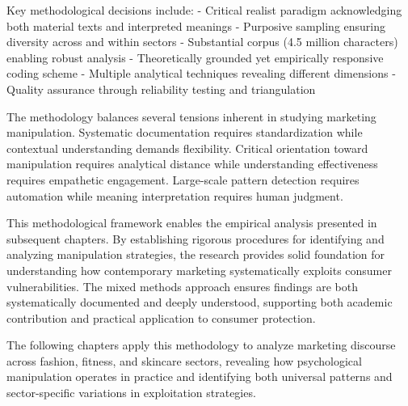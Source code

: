 Key methodological decisions include:
- Critical realist paradigm acknowledging both material texts and interpreted meanings
- Purposive sampling ensuring diversity across and within sectors
- Substantial corpus (4.5 million characters) enabling robust analysis
- Theoretically grounded yet empirically responsive coding scheme
- Multiple analytical techniques revealing different dimensions
- Quality assurance through reliability testing and triangulation

The methodology balances several tensions inherent in studying marketing manipulation. Systematic documentation requires standardization while contextual understanding demands flexibility. Critical orientation toward manipulation requires analytical distance while understanding effectiveness requires empathetic engagement. Large-scale pattern detection requires automation while meaning interpretation requires human judgment.

This methodological framework enables the empirical analysis presented in subsequent chapters. By establishing rigorous procedures for identifying and analyzing manipulation strategies, the research provides solid foundation for understanding how contemporary marketing systematically exploits consumer vulnerabilities. The mixed methods approach ensures findings are both systematically documented and deeply understood, supporting both academic contribution and practical application to consumer protection.

The following chapters apply this methodology to analyze marketing discourse across fashion, fitness, and skincare sectors, revealing how psychological manipulation operates in practice and identifying both universal patterns and sector-specific variations in exploitation strategies.